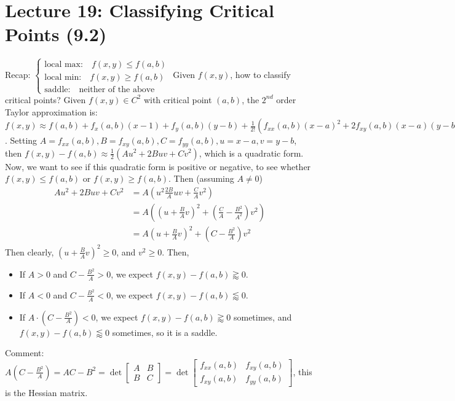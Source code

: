 \documentclass[tikz,10pt,letter]{article}
\theoremstyle{plain}
\theoremstyle{definition}
\begin{document}
\section*{Lecture 19: Classifying Critical Points (9.2)}
Recap: $\begin{cases}\text{local max:}\quad f(x,y)\leq f(a,b)\\\text{local min:}\quad f(x,y)\geq f(a,b)\\\text{saddle:}\quad\text{neither of the above}\end{cases}$ 
Given $f(x,y)$, how to classify critical points? Given $f(x,y)\in C^2$ with critical point $(a,b)$, the $2^{nd}$ order Taylor approximation is: $f(x,y)\approx f(a,b)+f_x(a,b)(x-1)+f_y(a,b)(y-b)+\frac{1}{2!}(f_{xx}(a,b)(x-a)^2+2f_{xy}(a,b)(x-a)(y-b)+f_{yy}(a,b)(y-b)^2)$. Setting $A=f_{xx}(a,b),B=f_{xy}(a,b),C=f_{yy}(a,b),u=x-a,v=y-b$, then $f(x,y)-f(a,b)\approx\frac{1}{2}(Au^2+2Buv+Cv^2)$, which is a quadratic form. Now, we want to see if this quadratic form is positive or negative, to see whether $f(x,y)\leq f(a,b)$ or $f(x,y)\geq f(a,b)$. Then (assuming $A\neq0$) 
\begin{align*}Au^2+2Buv+Cv^2&=A\left(u^2\frac{2B}{A}uv+\frac{C}{A}v^2\right)\\&=A\left((u+\frac{B}{A}v)^2+(\frac{C}{A}-\frac{B^2}{A^2})v^2\right)\\&=A\left(u+\frac{B}{A}v\right)^2+\left(C-\frac{B^2}{A}\right)v^2\end{align*}
Then clearly, $\left(u+\frac{B}{A}v\right)^2\geq0$, and $v^2\geq0$. Then, 
\begin{itemize}
    \item If $A>0$ and $C-\frac{B^2}{A}>0$, we expect $f(x,y)-f(a,b)\gtrapprox0$. 
    \item If $A<0$ and $C-\frac{B^2}{A}<0$, we expect $f(x,y)-f(a,b)\lessapprox0$. 
    \item If $A\cdot\left(C-\frac{B^2}{A}\right)<0$, we expect $f(x,y)-f(a,b)\gtrapprox0$ sometimes, and $f(x,y)-f(a,b)\lessapprox0$ sometimes, so it is a saddle. 
\end{itemize}
Comment: $A\left(C-\frac{B^2}{A}\right)=AC-B^2=\det\begin{bmatrix}A&B\\B&C\end{bmatrix}=\det\begin{bmatrix}f_{xx}(a,b)&f_{xy}(a,b)\\f_{xy}(a,b)&f_{yy}(a,b)\end{bmatrix}$, this is the Hessian matrix. 
\end{document}
